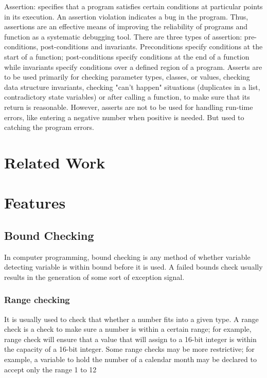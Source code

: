 \documentclass{sig-alternate}
\begin{document}
Assertion: specifies that a program satisfies certain conditions at particular points in its execution. An assertion violation indicates a bug in the program. Thus, assertions are an effective means of improving the reliability of programs and function as a systematic debugging tool. There are three types of assertion: pre-conditions, post-conditions and invariants. Preconditions specify conditions at the start of a function; post-conditions specify conditions at the end of a function while invariants specify conditions over a defined region of a program. Asserts are to be used primarily for checking parameter types, classes, or values, checking data structure invariants, checking "can't happen" situations (duplicates in a list, contradictory state variables) or after calling a function, to make sure that its return is reasonable. However, asserts are not to be used for handling run-time errors, like entering a negative number when positive is needed. But used to catching the program errors.

\section{Related Work}

\section{Features}

\subsection{Bound Checking}
In computer programming, bound checking is any method of whether variable detecting variable is within bound before it is used.  A failed bounds check usually results in the generation of some sort of exception signal.
\subsubsection{Range checking}
It is usually used to check that whether a number fits into a given type. A range check is a check to make sure a number is within a certain range; for example, range check will ensure that a value that will assign to a 16-bit integer is within the capacity of a 16-bit integer. Some range checks may be more restrictive; for example, a variable to hold the number of a calendar month may be declared to accept only the range 1 to 12
\end{document}

